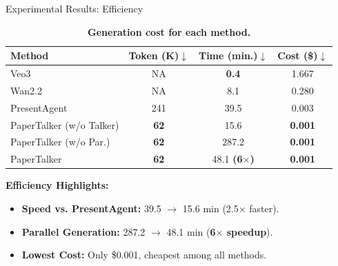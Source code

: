 \documentclass{beamer}
\newcommand{\alertterm}[1]{\alert{\textbf{#1}}}
\begin{document}
\begin{frame}{Experimental Results: Efficiency}
  \begin{table}[h]
    \centering
    \small
    \setlength{\tabcolsep}{3pt}
    \caption{\textbf{Generation cost for each method.}}
    \begin{tabular}{lccc}
      \toprule
      Method & Token (K)$\downarrow$ & Time (min.)$\downarrow$ & Cost (\$)$\downarrow$ \\
      \midrule
      Veo3~\cite{deepmind2025veo3} & NA & \textbf{0.4} & 1.667 \\
      Wan2.2~\cite{wan} & NA & 8.1 & 0.280 \\
      \midrule
      PresentAgent~\cite{shi2025presentagent} & 241 & 39.5 & 0.003  \\
      PaperTalker (w/o Talker) & \textbf{62} & 15.6 & \textbf{0.001}\\    
      \midrule
      PaperTalker (w/o Par.) & \textbf{62} & 287.2 & \textbf{0.001}\\
      PaperTalker & \textbf{62} & 48.1 \textbf{(\alertterm{6$\times$})} & \textbf{0.001} \\
      \bottomrule
    \end{tabular}
    \label{table:cost}
  \end{table}

  \vspace{-0.3\baselineskip}
  \small
  \textbf{Efficiency Highlights:}
  \begin{itemize}
    \item \textbf{Speed vs. PresentAgent:} 39.5 $\rightarrow$ 15.6 min (2.5$\times$ faster).  
    \item \textbf{Parallel Generation:} 287.2 $\rightarrow$ 48.1 min (\textbf{6$\times$ speedup}).  
    \item \textbf{Lowest Cost:} Only \$0.001, cheapest among all methods.  
  \end{itemize}
\end{frame}
\end{document}
